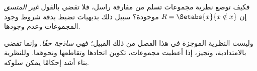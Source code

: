 \documentclass[../../../include/open-logic-section]{subfiles}
\begin{document}
\begin{digress}
فكيف توضع نظرية مجموعات تسلم من مفارقة راسل، فلا تقضي بالقول
\emph{غير المتسق} إن $R = \Setabs{x}{x \notin x}$ موجودة؟
سبيل ذلك بديهيات تضبط بدقة شروط وجود المجموعات وعدم وجودها.

وليست النظرية الموجزة في هذا الفصل من ذلك القبيل؛ فهي
\emph{ساذجة حقًا}. %
وإنما تقضي بالامتدادية، وتجيز، إذا أعطيت مجموعات، تكوين اتحادها
وتقاطعها ونحوهما. وللنظرية بناء أشد إحكامًا يمكن سلوكه.
\end{digress}
\end{document}
